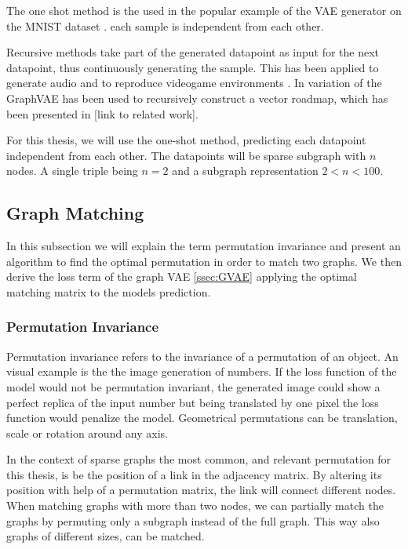 The one shot method is the used in the popular example of the VAE generator on the MNIST dataset \cite{kingma_auto-encoding_2014}. each sample is independent from each other.

Recursive methods take part of the generated datapoint as input for the next datapoint, thus continuously generating the sample. This has been applied to generate audio and to reproduce videogame environments \cite{ha_world_2018}. In \cite{belli_image-conditioned_2019} variation of the GraphVAE has been used to recursively construct a vector roadmap, which has been presented in [link to related work].

For this thesis, we will use the one-shot method, predicting each datapoint independent from each other. The datapoints will be sparse subgraph with $n$ nodes. A single triple being $n=2$ and a subgraph representation $2<n<100$. 

\subsection{Graph Matching}
\label{ssec:graphmatch}
In this subsection we will explain the term permutation invariance and present an algorithm to find the optimal permutation in order to match two graphs. We then derive the loss term of the graph VAE \ref{ssec:GVAE} applying the optimal matching matrix to the models prediction.

\subsubsection{Permutation Invariance}


Permutation invariance refers to the invariance of a permutation of an object. An visual example is the the image generation of numbers. If the loss function of the model would not be permutation invariant, the generated image could show a perfect replica of the input number but being translated by one pixel the loss function would penalize the model. Geometrical permutations can be translation, scale or rotation around any axis. 

In the context of sparse graphs the most common, and relevant permutation for this thesis, is be the position of a link in the adjacency matrix. By altering its position with help of a permutation matrix, the link will connect different nodes. When matching graphs with more than two nodes, we can partially match the graphs by permuting only a subgraph instead of the full graph. This way also graphs of different sizes, can be matched. 

